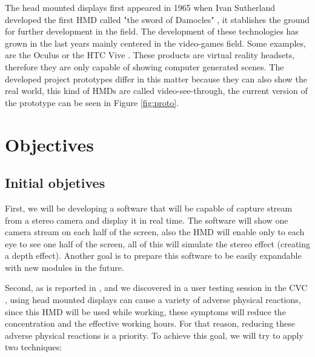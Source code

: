 \documentclass[10pt,a4paper,twocolumn,twoside]{article}
\begin{document}
	The head mounted displays first appeared in 1965 when Ivan Sutherland developed the first HMD called "the sword of Damocles" \cite{hdmSutherland}, it stablishes the ground for further development in the field. The development of these technologies has grown in the last years mainly centered in the video-games field. Some examples, are the Oculus \cite{web:oculus} or the HTC Vive \cite{web:vive}. These products are virtual reality headsets, therefore they are only capable of showing computer generated scenes. The developed project prototypes differ in this matter because they can also show the real world, this kind of HMDs are called video-see-through, the current version of the prototype can be seen in Figure \ref{fig:proto}. %
	
	
	
	\section{Objectives}
	
	\subsection{Initial objetives}
	First, we will be developing a software that will be capable of capture stream from a stereo camera and display it in real time. The software will show one camera stream on each half of the screen, also the HMD will enable only to each eye to see one half of the screen, all of this will simulate the stereo effect (creating a depth effect). Another goal is to prepare this software to be easily expandable with new modules in the future.
	
	Second, as is reported in \cite{disconfortReview}, and we discovered in a user testing session in the CVC \cite{unpublishCVC}, using head mounted displays can cause a variety of adverse physical reactions, since this HMD will be used while working, these symptoms will reduce the concentration and the effective working hours. For that reason, reducing these adverse physical reactions is a priority. To achieve this goal, we will try to apply two techniques: 
	
\end{document}
